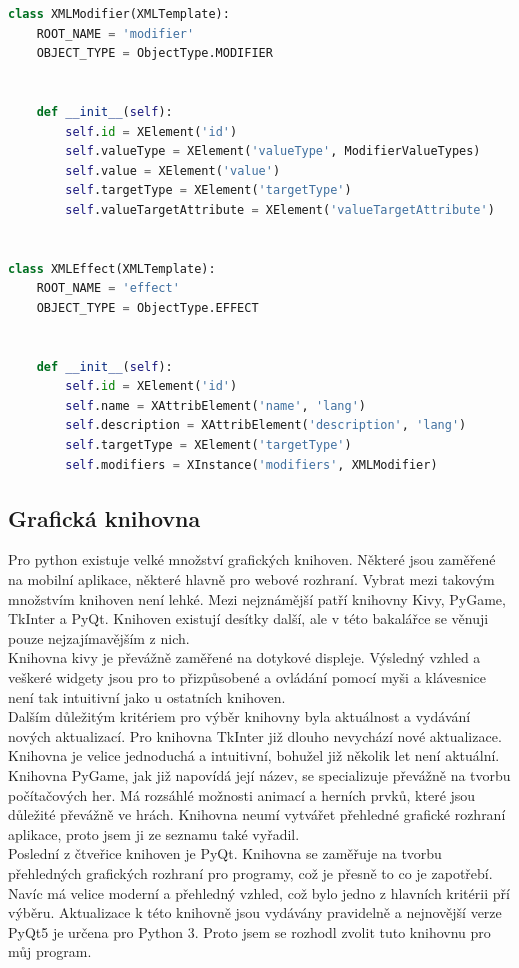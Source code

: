 \documentclass[thesis=B,czech]{resources/FITthesis}[2012/06/26]
\begin{document}
\begin{lstlisting}[float,language=Python, label=python_xml, caption=Mapování objektů na xml strukturu]
class XMLModifier(XMLTemplate):
    ROOT_NAME = 'modifier'
    OBJECT_TYPE = ObjectType.MODIFIER


    def __init__(self):
        self.id = XElement('id')
        self.valueType = XElement('valueType', ModifierValueTypes)
        self.value = XElement('value')
        self.targetType = XElement('targetType')
        self.valueTargetAttribute = XElement('valueTargetAttribute')


class XMLEffect(XMLTemplate):
    ROOT_NAME = 'effect'
    OBJECT_TYPE = ObjectType.EFFECT


    def __init__(self):
        self.id = XElement('id')
        self.name = XAttribElement('name', 'lang')
        self.description = XAttribElement('description', 'lang')
        self.targetType = XElement('targetType')
        self.modifiers = XInstance('modifiers', XMLModifier)

\end{lstlisting}

\subsection{Grafická knihovna}
Pro python existuje velké množství grafických knihoven. Některé jsou zaměřené na mobilní aplikace, některé hlavně pro webové rozhraní. Vybrat mezi takovým množstvím knihoven není lehké. Mezi nejznámější patří knihovny Kivy, PyGame, TkInter a PyQt. Knihoven existují desítky další, ale v této bakalářce se věnuji pouze nejzajímavějším z nich.\\
Knihovna kivy je převážně zaměřené na dotykové displeje. Výsledný vzhled a veškeré widgety jsou pro to přizpůsobené a ovládání pomocí myši a klávesnice není tak intuitivní jako u ostatních knihoven.\\
Dalším důležitým kritériem pro výběr knihovny byla aktuálnost a vydávání nových aktualizací. Pro knihovna TkInter již dlouho nevychází nové aktualizace. Knihovna je velice jednoduchá a intuitivní, bohužel již několik let není aktuální. \\
Knihovna PyGame, jak již napovídá její název, se specializuje převážně na tvorbu počítačových her. Má rozsáhlé možnosti animací a herních prvků, které jsou důležité převážně ve hrách. Knihovna neumí vytvářet přehledné grafické rozhraní aplikace, proto jsem ji ze seznamu také vyřadil.\\
Poslední z čtveřice knihoven je PyQt. Knihovna se zaměřuje na tvorbu přehledných grafických rozhraní pro programy, což je přesně to co je zapotřebí. Navíc má velice moderní a přehledný vzhled, což bylo jedno z hlavních kritérii pří výběru. Aktualizace k této knihovně jsou vydávány pravidelně a nejnovější verze PyQt5 je určena pro Python 3. Proto jsem se rozhodl zvolit tuto knihovnu pro můj program.
\end{document}
